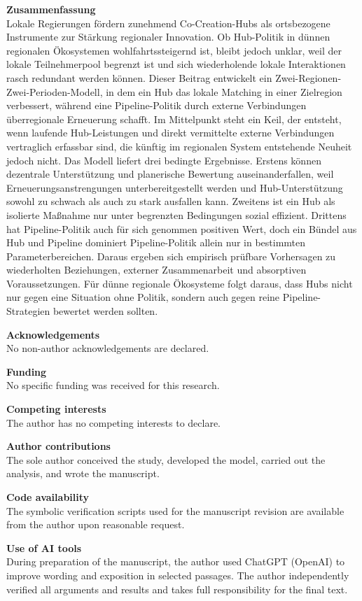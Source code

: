 \documentclass[12pt]{article}
\begin{document}
\textbf{Zusammenfassung}\\
Lokale Regierungen f\"ordern zunehmend Co-Creation-Hubs als ortsbezogene Instrumente zur St\"arkung regionaler Innovation. Ob Hub-Politik in d\"unnen regionalen \"Oko\-systemen wohlfahrts\-steigernd ist, bleibt jedoch unklar, weil der lokale Teilnehmerpool begrenzt ist und sich wiederholende lokale Interaktionen rasch redundant werden k\"onnen. Dieser Beitrag entwickelt ein Zwei-Regionen-Zwei-Perioden-Modell, in dem ein Hub das lokale Matching in einer Zielregion verbessert, w\"ahrend eine Pipeline-Politik durch externe Verbindungen \"uberregionale Erneuerung schafft. Im Mittelpunkt steht ein Keil, der entsteht, wenn laufende Hub-Leistungen und direkt vermittelte externe Verbindungen vertraglich erfassbar sind, die k\"unftig im regionalen System entstehende Neuheit jedoch nicht. Das Modell liefert drei bedingte Ergebnisse. Erstens k\"onnen dezentrale Unterst\"utzung und planerische Bewertung auseinanderfallen, weil Erneuerungsanstrengungen unterbereitgestellt werden und Hub-Unterst\"utzung sowohl zu schwach als auch zu stark ausfallen kann. Zweitens ist ein Hub als isolierte Ma{\ss}nahme nur unter begrenzten Bedingungen sozial effizient. Drittens hat Pipeline-Politik auch f\"ur sich genommen positiven Wert, doch ein B\"undel aus Hub und Pipeline dominiert Pipeline-Politik allein nur in bestimmten Parameterbereichen. Daraus ergeben sich empirisch pr\"ufbare Vorhersagen zu wiederholten Beziehungen, externer Zusammenarbeit und absorptiven Voraussetzungen. F\"ur d\"unne regionale \"Okosysteme folgt daraus, dass Hubs nicht nur gegen eine Situation ohne Politik, sondern auch gegen reine Pipeline-Strategien bewertet werden sollten.

\textbf{Acknowledgements}\\
No non-author acknowledgements are declared.

\textbf{Funding}\\
No specific funding was received for this research.

\textbf{Competing interests}\\
The author has no competing interests to declare.

\textbf{Author contributions}\\
The sole author conceived the study, developed the model, carried out the analysis, and wrote the manuscript.

\textbf{Code availability}\\
The symbolic verification scripts used for the manuscript revision are available from the author upon reasonable request.

\textbf{Use of AI tools}\\
During preparation of the manuscript, the author used ChatGPT (OpenAI) to improve wording and exposition in selected passages. The author independently verified all arguments and results and takes full responsibility for the final text.
\end{document}
